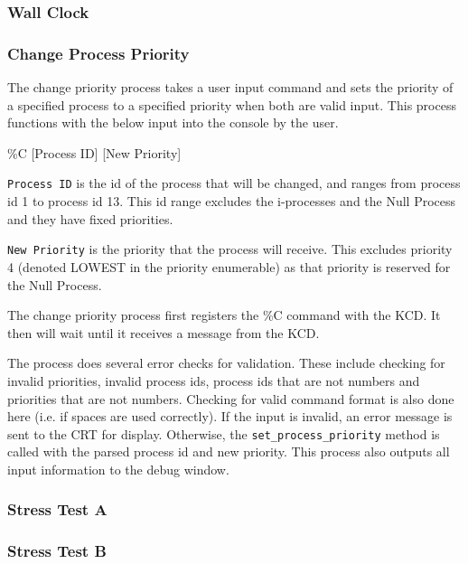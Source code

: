 \documentclass[se]{uw-wkrpt}
\begin{document}
\subsubsection{Wall Clock}

\subsubsection{Change Process Priority}

The change priority process takes a user input command and sets the priority of a specified process to a specified priority when both are valid input. This process functions with the below input into the console by the user.

\begin{code}
\%C [Process ID] [New Priority]
\end{code}

\texttt{Process ID} is the id of the process that will be changed, and ranges from process id 1 to process id 13. This id range excludes the i-processes and the Null Process and they have fixed priorities.

\texttt{New Priority} is the priority that the process will receive. This excludes priority 4 (denoted LOWEST in the priority enumerable) as that priority is reserved for the Null Process.

The change priority process first registers the \%C command with the KCD. It then will wait until it receives a message from the KCD.

The process does several error checks for validation. These include checking for invalid priorities, invalid process ids, process ids that are not numbers and priorities that are not numbers. Checking for valid command format is also done here (i.e. if spaces are used correctly). If the input is invalid, an error message is sent to the CRT for display. Otherwise, the \texttt{set\_process\_priority} method is called with the parsed process id and new priority. This process also outputs all input information to the debug window.

\subsubsection{Stress Test A}

\subsubsection{Stress Test B}
\end{document}
